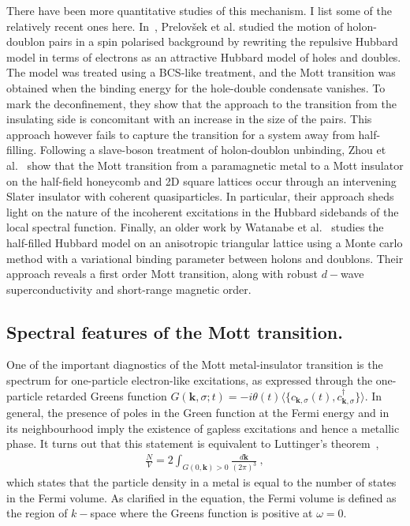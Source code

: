 There have been more quantitative studies of this mechanism. I list some of the relatively recent ones here. In~\cite{Prelovsek2015}, Prelovšek et al. studied the motion of holon-doublon pairs in a spin polarised background by rewriting the repulsive Hubbard model in terms of electrons as an attractive Hubbard model of holes and doubles. The model was treated using a BCS-like treatment, and the Mott transition was obtained when the binding energy for the hole-double condensate vanishes. To mark the deconfinement, they show that the approach to the transition from the insulating side is concomitant with an increase in the size of the pairs. This approach however fails to capture the transition for a system away from half-filling. Following a slave-boson treatment of holon-doublon unbinding, Zhou et al.~\cite{Zhou2014} show that the Mott transition from a paramagnetic metal to a Mott insulator on the half-field honeycomb and 2D square lattices occur through an intervening Slater insulator with coherent quasiparticles. In particular, their approach sheds light on the nature of the incoherent excitations in the Hubbard sidebands of the local spectral function. Finally, an older work by Watanabe et al.~\cite{Watanabe2006} studies the half-filled Hubbard model on an anisotropic triangular lattice using a Monte carlo method with a variational binding parameter between holons and doublons. Their approach reveals a first order Mott transition, along with robust \(d-\)wave superconductivity and short-range magnetic order.

\subsection{Spectral features of the Mott transition.} One of the important diagnostics of the Mott metal-insulator transition is the spectrum for one-particle electron-like excitations, as expressed through the one-particle retarded Greens function \(G(\bm k,\sigma; t) = -i \theta(t)\langle \{c_{\bm k,\sigma}(t), c^\dagger_{\bm k, \sigma}\} \rangle \). In general, the presence of poles in the Green function at the Fermi energy and in its neighbourhood imply the existence of gapless excitations and hence a metallic phase. It turns out that this statement is equivalent to Luttinger's theorem~\cite{luttinger1960fermi,luttinger1960ground},
\begin{equation}\begin{aligned}
	\frac{N}{V} = 2\int_{G(0,\bm k)>0}\frac{d\bm k}{(2\pi)^3}~,
\end{aligned}\end{equation}
which states that the particle density in a metal is equal to the number of states in the Fermi volume. As clarified in the equation, the Fermi volume is defined as the region of \(k-\)space where the Greens function is positive at \(\omega=0\).

